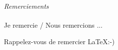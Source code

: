 %
\begin{center}
\huge{\emph{Remerciements}}
\end{center}

\vspace{1cm}

\paragraph{}
Je remercie / Nous remercions ...

Rappelez-vous de remercier \LaTeX  :-)